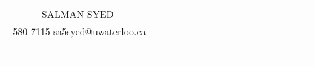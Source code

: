 \documentclass[letterpaper]{deedy-resume}
\begin{document}


\sffamily%

\hfill%
{\Huge\bfseries\begin{tabular}[c]{c}
\vspace*{-0.6cm}
SALMAN SYED\\
\fontsize{9}{0}
\selectfont
519-580-7115  \textbullet{} sa5syed@uwaterloo.ca
\end{tabular}}\hfill%
{\small\bfseries\begin{tabular}[c]{c}

\end{tabular}}\hfill%

\noindent\rule{7.5in}{0.4pt}
\end{document}
